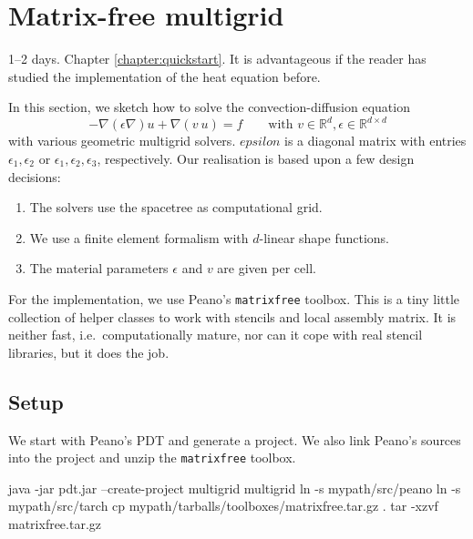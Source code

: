 
\section{Matrix-free multigrid}
  \label{section:applications:matrix-free-multigrid}

\chapterDescription
  {
    1--2 days.
  }
  {
    Chapter \ref{chapter:quickstart}. It is advantageous if the reader has
    studied the implementation of the heat equation before.
  }

In this section, we sketch how to solve the convection-diffusion equation
\[
  - \nabla (\epsilon \nabla) u + \nabla (v\ u) = f \qquad \mbox{with } v \in
  \mathbb{R}^d, \epsilon \in \mathbb{R}^{d \times d}
\]
with various geometric multigrid solvers. $epsilon$ is a diagonal matrix with
entries $\epsilon _1, \epsilon _2$ or $\epsilon _1, \epsilon _2, \epsilon _3$,
respectively.
Our realisation is based upon a few design decisions:

\begin{enumerate}
  \item The solvers use the spacetree as computational grid.
  \item We use a finite element formalism with $d$-linear shape functions.
  \item The material parameters $\epsilon $ and $v$ are given per cell.
\end{enumerate}


\noindent
For the implementation, we use Peano's \texttt{matrixfree} toolbox. 
This is a tiny little collection of helper classes to work with stencils and
local assembly matrix. 
It is neither fast, i.e.~computationally mature, nor can it cope with real
stencil libraries, but it does the job.



\subsection{Setup}

We start with Peano's PDT and generate a project. We also link Peano's sources
into the project and unzip the \texttt{matrixfree} toolbox. 
\begin{code}
  java -jar pdt.jar --create-project multigrid multigrid
  ln -s mypath/src/peano 
  ln -s mypath/src/tarch
  cp mypath/tarballs/toolboxes/matrixfree.tar.gz .
  tar -xzvf matrixfree.tar.gz
\end{code}


